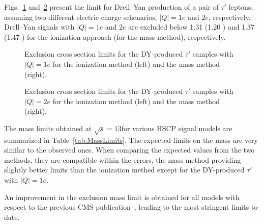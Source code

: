 Figs.~\ref{fig:massLim5} and~\ref{fig:massLim6}  present the limit for Drell--Yan production of a pair of  $\tau'$ leptons, 
assuming two different electric charge schenarios, $|Q| = 1e$ and $2e$, respectively.
Drell--Yan signals with $|Q| = 1e$ and $2e$ are excluded below 
 1.31 \TeV (1.20 \TeV)  and 1.37 \TeV (1.47 \TeV) for the ionization approach (for the mass method), respectively.

\begin{figure}[h!]
   \centering
   \caption{Exclusion cross section  limits for the {DY}-produced  $\tau'$  samples with $|Q| = 1e$
	for the ionization method (left) and the mass method (right).}
	\label{fig:massLim5}
\end{figure}

\begin{figure}[h!]
   \centering
   \caption{Exclusion cross section  limits for the {DY}-produced  $\tau'$  samples with $|Q| = 2e$
	for the ionization method (left) and the mass method (right).}
	\label{fig:massLim6}
\end{figure}

The mass limits obtained at  $\sqrt{s}=13$\TeV for various HSCP signal models are summarized in Table~\ref{tab:MassLimits}.  
The expected limits on the mass are very similar to the observed ones. When comparing the expected values from the two methods,
they are compatible within the errors, the mass method providing slightly better limits than the ionization methed except for
the {DY}-produced  $\tau'$ with $|Q| = 1e$.

An improvement in the exclusion mass limit is obtained for all models with respect to the previous CMS publication~\cite{Khachatryan:2016sfv},
leading to the most stringent limits to-date.

